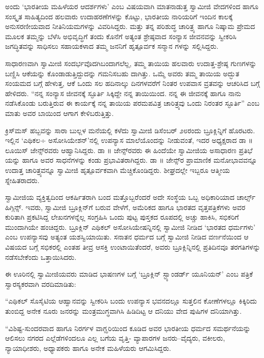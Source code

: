 ಅಂದು ‘ಭಾರತೀಯ ಮಹಿಳೆಯರ ಆದರ್ಶಗಳು’ ಎಂಬ ವಿಷಯವಾಗಿ ಮಾತನಾಡುತ್ತ ಸ್ವಾಮೀಜಿ ವೇದಗಳಿಂದ ಹಾಗೂ ಸಂಸ್ಕೃತ ಸಾಹಿತ್ಯದಿಂದ ಹಲವಾರು ಉದಾಹರಣೆಗಳನ್ನು ಕೊಟ್ಟು, ಭಾರತೀಯ ನಾರಿಯರಿಗೆ ಇಂದಿನ ಕಾಲಕ್ಕೆ ಅನುಸರಣೀಯವಾದ ನೀತಿನಿಯಮಗಳನ್ನು ವಿವರಿಸಿದ್ದರು. ಮತ್ತು ತನ್ನ ಪರಿಶುದ್ಧ ಚಾರಿತ್ರ್ಯ ಹಾಗೂ ನಿಷ್ಕಾಮ ಪ್ರೇಮದ ಮೂಲಕ ತಮ್ಮನ್ನು ಬೆಳೆಸಿ ಅಭಿವೃದ್ಧಿಗೆ ತಂದು ಕೊನೆಗೆ ಅತ್ಯಂತ ಶ್ರೇಷ್ಠವಾದ ಸಂನ್ಯಾಸ ಜೀವನವನ್ನು ಸ್ವೀಕರಿಸಿ ಜಗದ್ಧಿತವನ್ನು ಸಾಧಿಸಲು ಸಹಾಯಕಳಾದ ತಮ್ಮ ಜನನಿಗೆ ಹೃತ್ಪೂರ್ವಕ ಸನ್ಮಾನ ಗಳನ್ನು ಸಲ್ಲಿಸಿದ್ದರು.

ಸಾಧಾರಣವಾಗಿ ಸ್ವಾಮೀಜಿ ಸಂದರ್ಭವೊದಗಿಬಂದಾಗಲೆಲ್ಲ, ತಮ್ಮ ತಾಯಿಯ ಹಲವಾರು ಉದಾತ್ತ-ಶ್ರೇಷ್ಠ ಗುಣಗಳನ್ನು ಬಣ್ಣಿಸಿ ಆಕೆಯನ್ನು ಕೊಂಡಾಡುತ್ತಿದ್ದುದನ್ನು ಗಮನಿಸಬಹು ದಾಗಿತ್ತು. ಒಮ್ಮೆ ಅವರು ತಮ್ಮ ತಾಯಿಯ ಅದ್ಭುತ ಸಂಯಮದ ಬಗ್ಗೆ ಹೇಳುತ್ತ, ಆಕೆ ಒಂದು ಸಲ ಹದಿನಾಲ್ಕು ದಿನಗಳವರೆಗೆ ನಿಂತರ ಉಪವಾಸ ವ್ರತವನ್ನು ಆಚರಿಸಿದ ಬಗ್ಗೆ ಹೇಳಿದರು. “ನನ್ನ ಸಂನ್ಯಾಸ ಜೀವನಕ್ಕೆ ಸ್ಫೂರ್ತಿ ಸಿಕ್ಕಿದ್ದೇ ನನ್ನ ತಾಯಿಯಿಂದ. ನನ್ನ ಈ ಜೀವನಕ್ಕೆ ಹಾಗೂ ನಾನು ನಡೆಸಿಕೊಂಡು ಬರುತ್ತಿರುವ ಈ ಕಾರ್ಯಕ್ಕೆ ನನ್ನ ತಾಯಿಯ ಪರಮಪವಿತ್ರ ಚಾರಿತ್ರ್ಯವು ಒಂದು ನಿರಂತರ ಸ್ಫೂರ್ತಿ” ಎಂಬ ಮಾತು ಅವರ ಬಾಯಿಂದ ಆಗಾಗ ಕೇಳಿಬರುತ್ತಿತ್ತು.

ಕ್ರಿಸ್​ಮಸ್ ಹಬ್ಬವನ್ನು ಸಾರಾ ಬುಲ್ಲಳ ಮನೆಯಲ್ಲಿ ಕಳೆದು ಸ್ವಾಮೀಜಿ ಡಿಸೆಂಬರ್ ೨೮ರಂದು ಬ್ರೂಕ್ಲಿನ್ನಿಗೆ ಹೊರಟರು. ಇಲ್ಲಿನ ‘ಎಥಿಕಲ÷ ಅಸೋಸಿಯೇಶನ್​’ನಲ್ಲಿ ಉಪನ್ಯಾಸ ಮಾಲೆಯೊಂದನ್ನು ನೀಡುವಂತೆ, ಇದರ ಅಧ್ಯಕ್ಷರಾದ ಡಾ ॥ ಲೂಯಿಸ್ ಜೇನ್ಸ್​ರವರು ಆಹ್ವಾನಿಸಿದ್ದರು. ಡಾ ॥ ಜೇನ್ಸ್​ರವರು ಈ ಹಿಂದೆಯೇ ಸ್ವಾಮೀಜಿಯ ಅಸಾಧಾರಣ ಪ್ರತಿಭೆ ಯನ್ನು ಹಾಗೂ ಅವರ ಸಾಧನೆಗಳನ್ನು ಕಂಡು ಪ್ರಭಾವಿತರಾಗಿದ್ದರು. ಡಾ ॥ ಜೇನ್ಸ್​ರ ಪ್ರಾಮಾಣಿಕ ಮನೋಭಾವವನ್ನೂ ಉದಾತ್ತ ಚಾರಿತ್ರ್ಯವನ್ನೂ ಸ್ವಾಮೀಜಿ ಹೃತ್ಪೂರ್ವಕವಾಗಿ ಮೆಚ್ಚಿಕೊಂಡಿದ್ದರು. ಶೀಘ್ರದಲ್ಲೇ ಇಬ್ಬರೂ ಆತ್ಮೀಯ ಸ್ನೇಹಿತರಾದರು.

ಸ್ವಾಮೀಜಿಯ ವ್ಯಕ್ತಿತ್ವದಿಂದ ಆಕರ್ಷಿತರಾಗಿ ಬಂದ ಮತ್ತೊಬ್ಬರೆಂದರೆ ಅದೇ ಸಂಸ್ಥೆಯ ಒಬ್ಬ ಅಧಿಕಾರಿಯಾದ ಚಾರ್ಲ್ಸ್ ಹಿಗ್ಗಿನ್ಸ್. ಇವರು, ಸ್ವಾಮೀಜಿ ಬ್ರೂಕ್ಲಿನ್​ಗೆ ಬರುವ ವೇಳೆಗೆ, ಅಮೆರಿಕದ ಹಾಗೂ ಭಾರತದ ವೃತ್ತಪತ್ರಿಕೆಗಳು ಅವರ ಕುರಿತಾಗಿ ಪ್ರಕಟಿಸಿದ್ದ ಲೇಖನಗಳನ್ನೆಲ್ಲ ಸಂಗ್ರಹಿಸಿ ಒಂದು ಪುಟ್ಟ ಪುಸ್ತಕದ ರೂಪದಲ್ಲಿ ಅಚ್ಚು ಹಾಕಿಸಿ, ಸಭಿಕರಿಗೆ ಮುಂದಾಗಿಯೇ ಹಂಚಿದ್ದರು. ಬ್ರೂಕ್ಲಿನ್ ಎಥಿಕಲ್ ಅಸೋಸಿಯೇಷನ್ನಿನಲ್ಲಿ ಸ್ವಾಮೀಜಿ ನೀಡಿದ ‘ಭಾರತದ ಧರ್ಮಗಳು’ ಎಂಬ ಉಪನ್ಯಾಸವು ಅತ್ಯಂತ ಯಶಸ್ವಿಯಾಯಿತು. ಸನಾತನ ಧರ್ಮದ ಬಗ್ಗೆ ಸ್ವಾಮೀಜಿ ನೀಡಿದ ವರ್ಣನೆಯಿಂದ ಆ ವಿಷಯದ ಬಗ್ಗೆ ಸಭಿಕರಲ್ಲಿ ಎಂತಹ ತೀವ್ರ ಆಸಕ್ತಿ ಉಂಟಾಯಿತೆಂದರೆ, ಅವರು ಬ್ರೂಕ್ಲಿನ್ನಿನಲ್ಲಿ ಪ್ರತಿದಿನವೂ ತರಗತಿಗಳನ್ನು ನಡೆಸಬೇಕೆಂದು ಒತ್ತಾಯಿಸಿದರು.

ಈ ಊರಿನಲ್ಲಿ ಸ್ವಾಮೀಜಿಯವರು ಮಾಡಿದ ಭಾಷಣಗಳ ಬಗ್ಗೆ ‘ಬ್ರೂಕ್ಲಿನ್ ಸ್ಟ್ಯಾಂಡರ್ಡ್ ಯೂನಿಯನ್​’ ಎಂಬ ಪತ್ರಿಕೆ ಸ್ವಾರಸ್ಯಕರವಾಗಿ ವರದಿಮಾಡಿತು:

“ಎಥಿಕಲ್ ಸೊಸೈಟಿಯ ಆಹ್ವಾನವನ್ನು ಸ್ವೀಕರಿಸಿ ಬಂದು ಉಪನ್ಯಾಸ ಭವನದಲ್ಲೂ ಸುತ್ತಲಿನ ಕೋಣೆಗಳಲ್ಲೂ ಕಿಕ್ಕಿರಿದು ತುಂಬಿದ್ದ ಅನೇಕ ನೂರು ಜನರನ್ನು ಮಂತ್ರಮುಗ್ಧವಾಗಿಸಿ ಹಿಡಿದಿಟ್ಟ ಆ ದನಿಯು ವೇದ ಪುಷಿಗಳ ದನಿಯಾಗಿತ್ತು.

“ವಿಶಿಷ್ಟ-ಸುಂದರವಾದ ಹಾಗೂ ನಿರರ್ಗಳ ವಾಗ್ಝರಿಯಿಂದ ಕೂಡಿದ ಅವರ ಭಾರತೀಯ ಧರ್ಮದ ಸಮರ್ಥನೆಯನ್ನು ಆಲಿಸಲು ನಗರದ ಎಲ್ಲೆಡೆಗಳಿಂದಲೂ ಎಲ್ಲ ಬಗೆಯ ವೃತ್ತಿ- ವ್ಯಾಪಾರಗಳ ಜನರು–ವೈದ್ಯರು, ವಕೀಲರು, ನ್ಯಾಯಾಧೀಶರು, ಅಧ್ಯಾಪಕರು ಹಾಗೂ ಅನೇಕ ಮಹಿಳೆಯರು ಆಗಮಿಸಿದ್ದರು.

